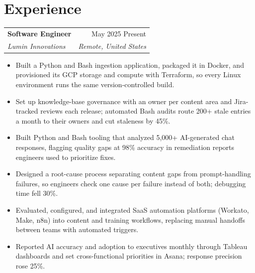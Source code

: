 \documentclass[letterpaper,10pt]{article}
\makeatletter
\newenvironment{bullets}
  {\begin{itemize}[leftmargin=1.15em,labelsep=0.45em,itemsep=1.3pt,
                   topsep=2.5pt,parsep=0pt,partopsep=0pt,label=\textbullet]}
  {\end{itemize}\vspace{1pt}}
\newcommand{\entry}[4]{%
  \begin{tabularx}{\linewidth}{@{}X r@{}}
    \textbf{#1} & #2 \\
    \textit{#3} & \textit{#4} \\
  \end{tabularx}%
  \vspace{-3pt}
}
\makeatother
\begin{document}
\section{Experience}

\entry{Software Engineer}{May 2025 \textendash{} Present}
      {Lumin Innovations}{Remote, United States}  %
\begin{bullets}
  \item Built a Python and Bash ingestion application, packaged it in Docker, and
        provisioned its GCP storage and compute with Terraform, so every Linux
        environment runs the same version-controlled build.
  \item Set up knowledge-base governance with an owner per content area and
        Jira-tracked reviews each release; automated Bash audits route 200+ stale
        entries a month to their owners and cut staleness by 45\%.
  \item Built Python and Bash tooling that analyzed 5,000+ AI-generated chat
        responses, flagging quality gaps at 98\% accuracy in remediation reports
        engineers used to prioritize fixes.
  \item Designed a root-cause process separating content gaps from prompt-handling
        failures, so engineers check one cause per failure instead of both;
        debugging time fell 30\%.
  \item Evaluated, configured, and integrated SaaS automation platforms (Workato,
        Make, n8n) into content and training workflows, replacing manual handoffs
        between teams with automated triggers.
  \item Reported AI accuracy and adoption to executives monthly through Tableau
        dashboards and set cross-functional priorities in Asana; response
        precision rose 25\%.
\end{bullets}
\end{document}
